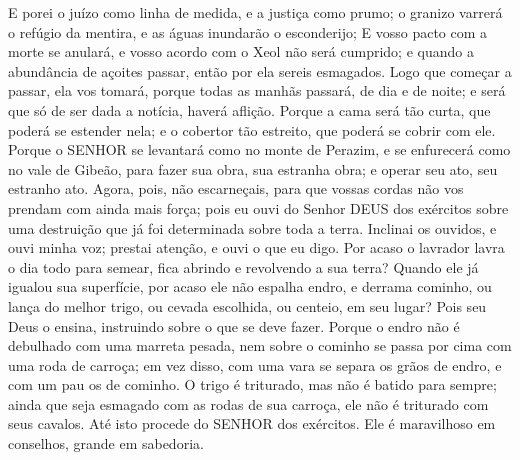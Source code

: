 {
  E porei o juízo como linha de medida, e a justiça como prumo; o granizo varrerá o refúgio da mentira, e as águas inundarão o esconderijo;
  E vosso pacto com a morte se anulará, e vosso acordo com o Xeol não será cumprido; e quando a abundância de açoites passar, então por ela sereis esmagados.
  Logo que começar a passar, ela vos tomará, porque todas as manhãs passará, de dia e de noite; e será que só de ser dada a notícia,
{} haverá aflição.
  Porque a cama será tão curta, que
{} poderá se estender nela; e o cobertor tão estreito, que
{} poderá se cobrir com ele.
  Porque o SENHOR se levantará como no monte de Perazim, e se enfurecerá como no vale de Gibeão, para fazer sua obra, sua estranha obra; e operar seu ato, seu estranho ato.
  Agora, pois, não escarneçais, para que vossas cordas não vos prendam com ainda mais força; pois eu ouvi do Senhor DEUS dos exércitos sobre uma destruição que já foi determinada sobre toda a terra.
  Inclinai os ouvidos, e ouvi minha voz; prestai atenção, e ouvi o que eu digo.
  Por acaso o lavrador lavra o dia todo para semear,
{} fica
{} abrindo e revolvendo a sua terra?
  Quando ele já igualou sua superfície, por acaso ele não espalha endro, e derrama cominho, ou lança do melhor trigo, ou cevada escolhida, ou centeio,
{} em seu lugar?
  Pois seu Deus o ensina, instruindo sobre o que se deve fazer.
  Porque o endro não é debulhado com uma marreta pesada, nem sobre o cominho se passa por cima com uma roda de carroça; em vez disso, com uma vara se separa os grãos de endro, e com um pau os de cominho.
  O trigo é triturado, mas não é batido para sempre; ainda que seja esmagado com as rodas de sua carroça, ele não é triturado com seus cavalos.
  Até isto procede do SENHOR dos exércitos. Ele é maravilhoso em conselhos,
{} grande em sabedoria.
\par }

